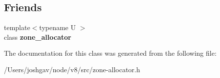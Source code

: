 \subsection*{Friends}
\begin{DoxyCompactItemize}
\item 
{\footnotesize template$<$typename U $>$ }\\class {\bfseries zone\+\_\+allocator}\hypertarget{classv8_1_1internal_1_1zone__allocator_afcabc8cbdfd097d75094d17cd848aada}{}\label{classv8_1_1internal_1_1zone__allocator_afcabc8cbdfd097d75094d17cd848aada}

\end{DoxyCompactItemize}


The documentation for this class was generated from the following file\+:\begin{DoxyCompactItemize}
\item 
/\+Users/joshgav/node/v8/src/zone-\/allocator.\+h\end{DoxyCompactItemize}
